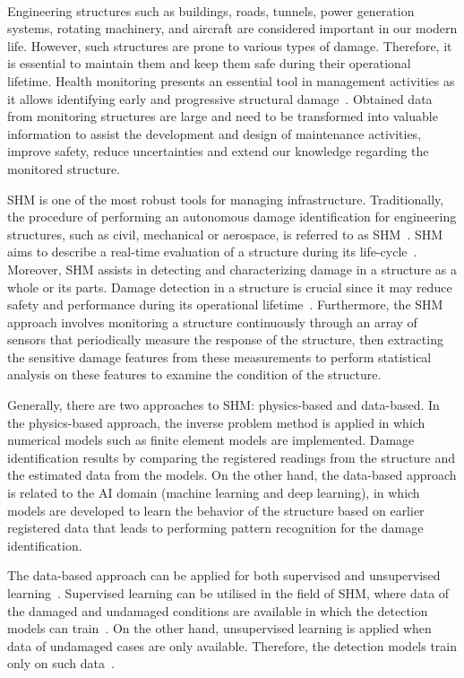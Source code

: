\paragraph{}
Engineering structures such as buildings, roads, tunnels, power generation systems, rotating machinery, and aircraft are considered important in our modern life.
However, such structures are prone to various types of damage.
Therefore, it is essential to maintain them and keep them safe during their operational lifetime.
Health monitoring presents an essential tool in management activities as it allows identifying early and progressive structural damage~\cite{Farrar2007}. 
Obtained data from monitoring structures are large and need to be transformed into valuable information to assist the development and design of maintenance activities, improve safety, reduce uncertainties and extend our knowledge regarding the monitored structure.

SHM is one of the most robust tools for managing infrastructure.
Traditionally, the procedure of performing an autonomous damage identification for engineering structures, such as civil, mechanical or aerospace, is referred to as SHM~\cite{farrar2001vibration}.
SHM aims to describe a real-time evaluation of a structure during its life-cycle~\cite{Balageas2010}. 
Moreover, SHM assists in detecting and characterizing damage in a structure as a whole or its parts. 
Damage detection in a structure is crucial since it may reduce safety and performance during its operational lifetime~\cite{Yuan2016}.
Furthermore, the SHM approach involves monitoring a structure continuously through an array of sensors that periodically measure the response of the structure, then extracting the sensitive damage features from these measurements to perform statistical analysis on these features to examine the condition of the structure.

Generally, there are two approaches to SHM: physics-based and
data-based.
In the physics-based approach, the inverse problem method is applied in which numerical models such as finite element models are implemented. 
Damage identification results by comparing the registered readings from the structure and the estimated data from the models.
On the other hand, the data-based approach is related to the AI domain (machine learning and deep learning), in which models are developed to learn the behavior of the structure based on earlier registered data that leads to performing pattern recognition for the damage identification.

The data-based approach can be applied for both supervised and unsupervised learning~\cite{worden2007application}.
Supervised learning can be utilised in the field of SHM, where data of the damaged and undamaged conditions are available in which the detection models can train~\cite{figueiredo2018machine}.
On the other hand, unsupervised learning is applied when data of undamaged cases are only available.
Therefore, the detection models train only on such data~\cite{figueiredo2018machine}.

